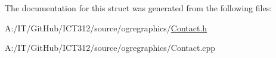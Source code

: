 The documentation for this struct was generated from the following files\-:\begin{DoxyCompactItemize}
\item 
A\-:/\-I\-T/\-Git\-Hub/\-I\-C\-T312/source/ogregraphics/\hyperlink{_contact_8h}{Contact.\-h}\item 
A\-:/\-I\-T/\-Git\-Hub/\-I\-C\-T312/source/ogregraphics/Contact.\-cpp\end{DoxyCompactItemize}
